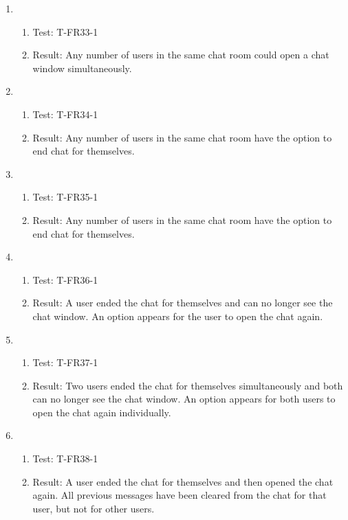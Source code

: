 \documentclass[12pt, titlepage]{article}
\begin{document}
\begin{enumerate}[\indent {}]
        \item 
            \begin{enumerate}[ ]
                \item Test: T-FR33-1
                \item Result: Any number of users in the same chat room could open a chat window simultaneously.
            \end{enumerate}
            
        \item 
            \begin{enumerate}[ ]
                \item Test: T-FR34-1
                \item Result: Any number of users in the same chat room have the option to end chat for themselves.
            \end{enumerate}
            
        \item 
            \begin{enumerate}[ ]
                \item Test: T-FR35-1
                \item Result: Any number of users in the same chat room have the option to end chat for themselves.
            \end{enumerate}
            
        \item 
            \begin{enumerate}[ ]
                \item Test: T-FR36-1
                \item Result: A user ended the chat for themselves and can no longer see the chat window. An option appears for the user to open the chat again.
            \end{enumerate}
            
        \item 
            \begin{enumerate}[ ]
                \item Test: T-FR37-1
                \item Result: Two users ended the chat for themselves simultaneously and both can no longer see the chat window. An option appears for both users to open the chat again individually.
            \end{enumerate}   
            
        \item 
            \begin{enumerate}[ ]
                \item Test: T-FR38-1
                \item Result: A user ended the chat for themselves and then opened the chat again. All previous messages have been cleared from the chat for that user, but not for other users.
            \end{enumerate}
            

\end{enumerate}
\end{document}

